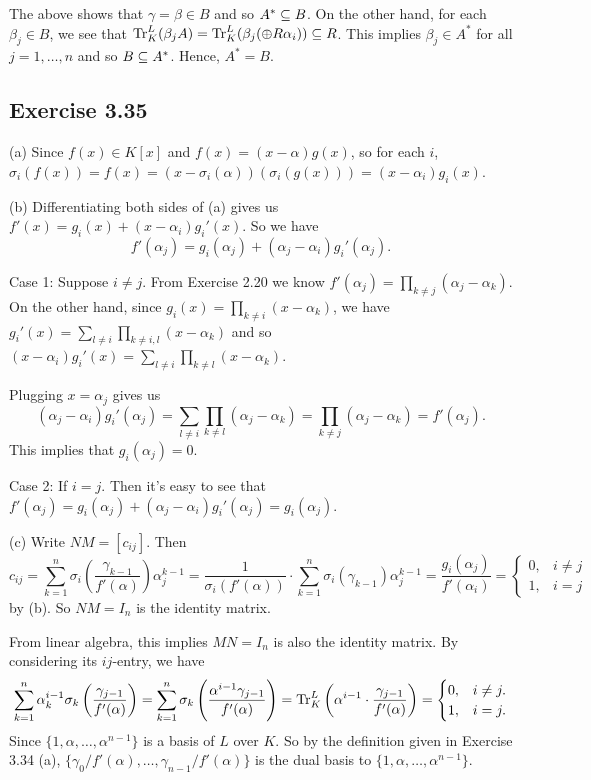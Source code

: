 \documentclass[../Marcus.tex]{subfiles}
\begin{document}
The above shows that $\gamma = \beta \in B$ and so $A^* \subseteq B$. On the other hand, for each $\beta_j \in B$, we see that $\operatorname{Tr}^L_K(\beta_j A) = \operatorname{Tr}^L_K(\beta_j (\oplus R\alpha_i)) \subseteq R$. This implies $\beta_j\in A^*$ for all $j=1,\ldots,n$ and so $B\subseteq A^*$. Hence, $A^*=B$.

\subsection*{Exercise 3.35}

(a) Since $f(x)\in K[x]$ and $f(x)=(x-\alpha)g(x)$, so for each $i$, $\sigma_i(f(x)) = f(x) = (x-\sigma_i(\alpha))(\sigma_i(g(x))) = (x-\alpha_i)g_i(x)$.

(b) Differentiating both sides of (a) gives us $f'(x) = g_i(x) + (x-\alpha_i)g_i'(x)$. So we have
$$
f'(\alpha_j) = g_i(\alpha_j) + (\alpha_j-\alpha_i)g_i'(\alpha_j).
$$

Case 1: Suppose $i\neq j$. From Exercise 2.20 we know $f'(\alpha_j) = \prod_{k\neq j} (\alpha_j-\alpha_k)$. On the other hand, since $g_i(x) = \prod_{k\neq i} (x-\alpha_k)$, we have $g_i'(x) = \sum_{l\neq i} \prod_{k\neq i,l} (x-\alpha_k)$ and so $(x-\alpha_i)g_i'(x) = \sum_{l\neq i} \prod_{k\neq l} (x-\alpha_k)$.

Plugging $x=\alpha_j$ gives us
$$
(\alpha_j-\alpha_i) g_i'(\alpha_j)
= \sum_{l\neq i} \prod_{k\neq l} (\alpha_j-\alpha_k)
= \prod_{k\neq j} (\alpha_j-\alpha_k)
= f'(\alpha_j).
$$
This implies that $g_i(\alpha_j) = 0$.

Case 2: If $i=j$. Then it's easy to see that $f'(\alpha_j) = g_i(\alpha_j) + (\alpha_j-\alpha_i)g_i'(\alpha_j) = g_i(\alpha_j)$.

(c) Write $NM=[c_{ij}]$. Then
$$
c_{ij}
= \sum_{k=1}^n \sigma_i\left( \frac{\gamma_{k-1}}{f'(\alpha)} \right) \alpha_j^{k-1}
= \frac{1}{ \sigma_i(f'(\alpha)) } \cdot \sum_{k=1}^n \sigma_i(\gamma_{k-1}) \alpha_j^{k-1}
= \frac{ g_i(\alpha_j) }{ f'(\alpha_i) }
=
\begin{cases}
		0, & i\neq j \\
		1, & i = j
\end{cases}
$$
by (b). So $NM=I_n$ is the identity matrix.

From linear algebra, this implies $MN=I_n$ is also the identity matrix. By considering its $ij$-entry, we have
$$
\sum_{k=1}^n \alpha_k^{i-1}\sigma_k \left( \frac{\gamma_{j-1}}{f'(\alpha)} \right)
= \sum_{k=1}^n \sigma_k \left( \frac{ \alpha^{i-1} \gamma_{j-1} }{ f'(\alpha) } \right)
= \operatorname{Tr}^L_K \left( \alpha^{i-1} \cdot \frac{\gamma_{j-1}}{f'(\alpha)} \right)
=
\begin{cases}
		0, & i\neq j. \\
		1, & i = j.
\end{cases}
$$
Since $\{1,\alpha,\ldots,\alpha^{n-1}\}$ is a basis of $L$ over $K$. So by the definition given in Exercise 3.34 (a), $\{\gamma_0/f'(\alpha),\ldots,\gamma_{n-1}/f'(\alpha)\}$ is the dual basis to $\{1,\alpha,\ldots,\alpha^{n-1}\}$.
\end{document}
